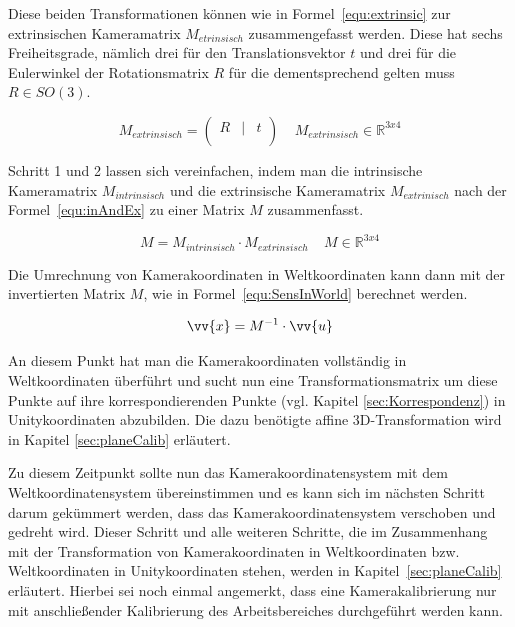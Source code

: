 \begin{description}
Diese beiden Transformationen können wie in Formel~\ref{equ:extrinsic} zur extrinsischen Kameramatrix $M_{etrinsisch}$ zusammengefasst werden. Diese hat sechs Freiheitsgrade, nämlich drei für den Translationsvektor $t$ und drei für die Eulerwinkel der Rotationsmatrix $R$ für die dementsprechend gelten muss $R \in SO(3)$.

\begin{equation}
\label{equ:extrinsic}
M_{extrinsisch}= 
\begin{pmatrix}
R &|& t \\
\end{pmatrix} 
~ ~ ~ ~ ~M_{extrinsisch} \in \mathbb{R}^{3x4}
\end{equation}

Schritt 1 und 2 lassen sich vereinfachen, indem man die intrinsische Kameramatrix $M_{intrinsisch}$ und die extrinsische Kameramatrix $M_{extrinisch}$ nach der Formel~\ref{equ:inAndEx} zu einer Matrix $M$ zusammenfasst.

\begin{equation}
\label{equ:inAndEx}
M = M_{intrinsisch} \cdot M_{extrinsisch}~ ~ ~ ~ ~M\in \mathbb{R}^{3x4}
\end{equation}

Die Umrechnung von Kamerakoordinaten in Weltkoordinaten kann dann mit der invertierten Matrix $M$, wie in Formel~\ref{equ:SensInWorld} berechnet werden. \

\begin{equation}
\label{equ:SensInWorld}
\vv{x} = M^{-1} \cdot \vv{u}
\end{equation}

An diesem Punkt hat man die Kamerakoordinaten vollständig in Weltkoordinaten überführt und sucht nun eine Transformationsmatrix um diese Punkte auf ihre korrespondierenden Punkte (vgl. Kapitel \ref{sec:Korrespondenz}) in Unitykoordinaten abzubilden. Die dazu benötigte affine 3D-Transformation wird in Kapitel \ref{sec:planeCalib} erläutert.
\end{description}

Zu diesem Zeitpunkt sollte nun das Kamerakoordinatensystem mit dem Weltkoordinatensystem übereinstimmen und es kann sich im nächsten Schritt darum gekümmert werden, dass das Kamerakoordinatensystem verschoben und gedreht wird. Dieser Schritt und alle weiteren Schritte, die im Zusammenhang mit der Transformation von Kamerakoordinaten in Weltkoordinaten bzw. Weltkoordinaten in Unitykoordinaten stehen, werden in Kapitel~\ref{sec:planeCalib} erläutert. Hierbei sei noch einmal angemerkt, dass eine Kamerakalibrierung nur mit anschließender Kalibrierung des Arbeitsbereiches durchgeführt werden kann.


